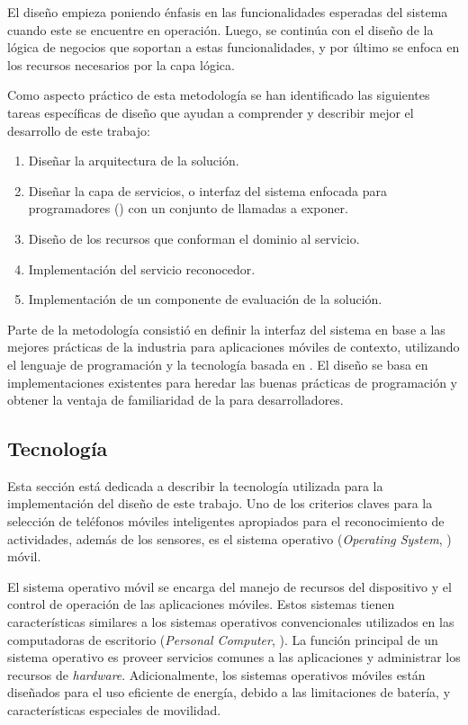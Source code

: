 El diseño empieza poniendo énfasis en las funcionalidades esperadas
del sistema cuando este se encuentre en operación. Luego, se continúa
con el diseño de la lógica de negocios que soportan a estas funcionalidades,
y por último se enfoca en los recursos necesarios por la capa lógica.

Como aspecto práctico de esta metodología se han identificado las
siguientes tareas específicas de diseño que ayudan a comprender y
describir mejor el desarrollo de este trabajo:
\begin{enumerate}
\item Diseñar la arquitectura de la solución.
\item Diseñar la capa de servicios, o interfaz del sistema enfocada para
programadores () con un conjunto de llamadas a exponer.
\item Diseño de los recursos que conforman el dominio al servicio.
\item Implementación del servicio reconocedor.
\item Implementación de un componente de evaluación de la solución.
\end{enumerate}
Parte de la metodología consistió en definir la interfaz del sistema
en base a las mejores prácticas de la industria para aplicaciones
móviles de contexto, utilizando el lenguaje de programación \emph{}
y la tecnología basada en \emph{}. El diseño se basa
en implementaciones existentes \cite{Google2016m} para heredar las
buenas prácticas de programación y obtener la ventaja de familiaridad
de la  para desarrolladores.

\subsection{Tecnología}

\label{ssec52:tecnologia}Esta sección está dedicada a describir la
tecnología utilizada para la implementación del diseño de este trabajo.
Uno de los criterios claves para la selección de teléfonos móviles
inteligentes apropiados para el reconocimiento de actividades, además
de los sensores, es el sistema operativo (\emph{Operating System},
) móvil. 

El sistema operativo móvil se encarga del manejo de recursos del dispositivo
y el control de operación de las aplicaciones móviles. Estos sistemas
tienen características similares a los sistemas operativos convencionales
utilizados en las computadoras de escritorio (\emph{Personal Computer},
). La función principal de un sistema operativo es proveer
servicios comunes a las aplicaciones y administrar los recursos de
\emph{hardware}. Adicionalmente, los sistemas operativos móviles están
diseñados para el uso eficiente de energía, debido a las limitaciones
de batería, y características especiales de movilidad. 

